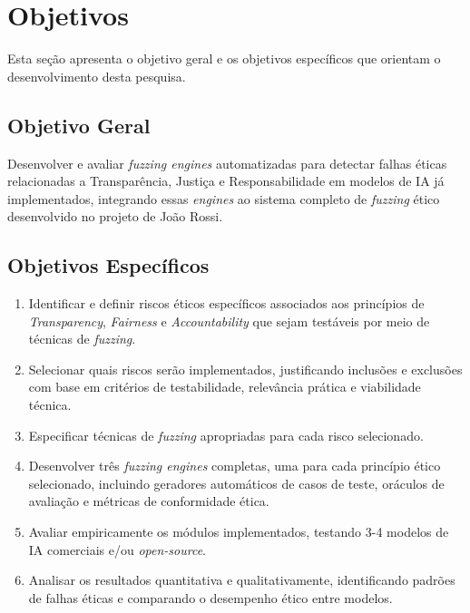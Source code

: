 \section{Objetivos}

Esta seção apresenta o objetivo geral e os objetivos específicos que orientam o desenvolvimento desta pesquisa.

\subsection{Objetivo Geral}

Desenvolver e avaliar \textit{fuzzing engines} automatizadas para detectar falhas éticas relacionadas a Transparência, Justiça e Responsabilidade em modelos de IA já implementados, integrando essas \textit{engines} ao sistema completo de \textit{fuzzing} ético desenvolvido no projeto de João Rossi.

\subsection{Objetivos Específicos}

\begin{enumerate}
    \item Identificar e definir riscos éticos específicos associados aos princípios de \textit{Transparency}, \textit{Fairness} e \textit{Accountability} que sejam testáveis por meio de técnicas de \textit{fuzzing}.
    
    \item Selecionar quais riscos serão implementados, justificando inclusões e exclusões com base em critérios de testabilidade, relevância prática e viabilidade técnica.
    
    \item Especificar técnicas de \textit{fuzzing} apropriadas para cada risco selecionado.
    
    \item Desenvolver três \textit{fuzzing engines} completas, uma para cada princípio ético selecionado, incluindo geradores automáticos de casos de teste, oráculos de avaliação e métricas de conformidade ética.
    
    \item Avaliar empiricamente os módulos implementados, testando 3-4 modelos de IA comerciais e/ou \textit{open-source}.
    
    \item Analisar os resultados quantitativa e qualitativamente, identificando padrões de falhas éticas e comparando o desempenho ético entre modelos.
\end{enumerate}

